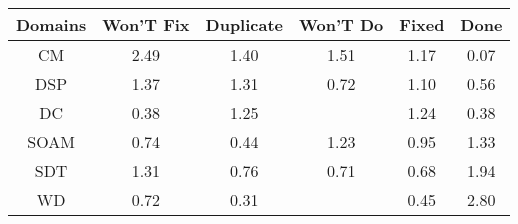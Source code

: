 \begin{tabular}{|c||c|c|c|c|c|}
\hline
Domains & Won'T Fix & Duplicate & Won'T Do & Fixed & Done \\ 
\hline
CM & \cellcolor[rgb]{0.5953434003537869,0.6909521370096885,0.42} 2.49 & \cellcolor[rgb]{0.8255742989754037,0.8000088784620333,0.42} 1.40 & \cellcolor[rgb]{0.8028992515617898,0.7892680665292688,0.42} 1.51 & \cellcolor[rgb]{0.8743923061229015,0.8231331976371639,0.42000000000000004} 1.17 & \cellcolor[rgb]{0.76,0.13,0.28} 0.07 \\ 
\hline
DSP & \cellcolor[rgb]{0.8319339278311954,0.8030213342358293,0.42} 1.37 & \cellcolor[rgb]{0.845361071983787,0.8093815604133727,0.42} 1.31 & \cellcolor[rgb]{0.8653306798141663,0.6285652177870542,0.37830863449322194} 0.72 & \cellcolor[rgb]{0.888129981486101,0.8296405175460478,0.42} 1.10 & \cellcolor[rgb]{0.8391265340606755,0.5045322612205307,0.3538514317899638} 0.56 \\ 
\hline
DC & \cellcolor[rgb]{0.8093268847872839,0.3634805879931434,0.3260384258014649} 0.38 & \cellcolor[rgb]{0.857135612961348,0.8149589745606385,0.42} 1.25 &  & \cellcolor[rgb]{0.8593635115259032,0.8160142949333224,0.42} 1.24 & \cellcolor[rgb]{0.8092981935963593,0.3633447830227674,0.32601164735660204} 0.38 \\ 
\hline
SOAM & \cellcolor[rgb]{0.8677811814995756,0.6401642590979914,0.38059576939960393} 0.74 & \cellcolor[rgb]{0.8194017128121998,0.41116810731107845,0.3354415986247197} 0.44 & \cellcolor[rgb]{0.8611356906539461,0.8168537482045009,0.42} 1.23 & \cellcolor[rgb]{0.901849615415404,0.8014215129662453,0.41239297438771033} 0.95 & \cellcolor[rgb]{0.8409856822745688,0.8073090073932168,0.42} 1.33 \\ 
\hline
SDT & \cellcolor[rgb]{0.845430809448122,0.8094145939491103,0.41999999999999993} 1.31 & \cellcolor[rgb]{0.8716014952956443,0.6582470777327167,0.3841613956092681} 0.76 & \cellcolor[rgb]{0.8633187700216967,0.6190421781026976,0.37643085202025023} 0.71 & \cellcolor[rgb]{0.8578630895484718,0.5932186238627665,0.3713388835785737} 0.68 & \cellcolor[rgb]{0.7126033200194681,0.746496309482906,0.42} 1.94 \\ 
\hline
WD & \cellcolor[rgb]{0.8647059586629493,0.6256082043379597,0.3777255614187526} 0.72 & \cellcolor[rgb]{0.7987988825405604,0.31364804402531926,0.31621229037118975} 0.31 &  & \cellcolor[rgb]{0.8219340549809262,0.4231545269097172,0.3378051179821978} 0.45 & \cellcolor[rgb]{0.53,0.66,0.42} 2.80 \\ 
\hline
\end{tabular}